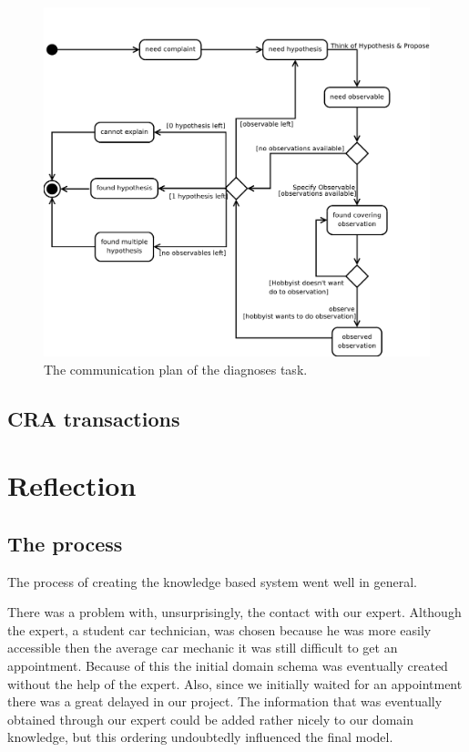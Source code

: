 \documentclass[a4paper,10pt]{article}
\begin{document}
\begin{figure}[htbp]
	\centering
		\includegraphics[width=1.00\textwidth]{communicationPlan.pdf}
	\caption{The communication plan of the diagnoses task.}
	\label{fig:communicationPlan}
\end{figure}

\subsection{CRA transactions}



\section{Reflection}
\subsection{The process}
The process of creating the knowledge based system went well in general.

There was a problem with, unsurprisingly, the contact with our expert. Although the expert, a student car technician, was chosen because he was more easily accessible then the average car mechanic it was still difficult to get an appointment. Because of this the initial domain schema was eventually created without the help of the expert. Also, since we initially waited for an appointment there was a great delayed in our project. The information that was eventually obtained through our expert could be added rather nicely to our domain knowledge, but this ordering undoubtedly influenced the final model.
\end{document}
